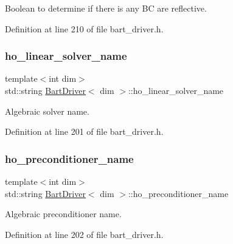 Boolean to determine if there is any BC are reflective. 



Definition at line 210 of file bart\+\_\+driver.\+h.

\mbox{\label{class_bart_driver_a7dcefb31d64ad2e76d4c04a44cb26f7c}} 
\subsubsection{\texorpdfstring{ho\+\_\+linear\+\_\+solver\+\_\+name}{ho\_linear\_solver\_name}}
{\footnotesize\ttfamily template$<$int dim$>$ \\
std\+::string \hyperlink{class_bart_driver}{Bart\+Driver}$<$ dim $>$\+::ho\+\_\+linear\+\_\+solver\+\_\+name\hspace{0.3cm}{\ttfamily [private]}}



Algebraic solver name. 



Definition at line 201 of file bart\+\_\+driver.\+h.

\mbox{\label{class_bart_driver_a0662a7c4208dc352aec9adf789edb463}} 
\subsubsection{\texorpdfstring{ho\+\_\+preconditioner\+\_\+name}{ho\_preconditioner\_name}}
{\footnotesize\ttfamily template$<$int dim$>$ \\
std\+::string \hyperlink{class_bart_driver}{Bart\+Driver}$<$ dim $>$\+::ho\+\_\+preconditioner\+\_\+name\hspace{0.3cm}{\ttfamily [private]}}



Algebraic preconditioner name. 



Definition at line 202 of file bart\+\_\+driver.\+h.

\mbox{\label{class_bart_driver_a83323d9561c906f6094a51a5c936cea4}} 
